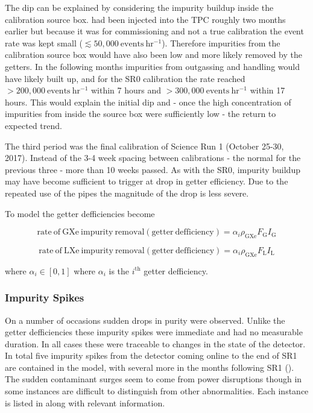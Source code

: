 The dip can be explained by considering the impurity buildup inside the calibration source box.  \rncal had been injected into the TPC
roughly two months earlier but because it was for commissioning and not a true calibration the event rate was kept small
($\lesssim 50,000\ \mathrm{events\ hr^{-1}}$).  Therefore
impurities from the calibration source box would have also been low and more likely removed by the getters.  In the following months
impurities from outgassing and handling would have likely built up, and for the SR0 calibration the rate reached
$> 200,000\ \mathrm{events\ hr^{-1}}$ within 7 hours and $> 300,000\ \mathrm{events\ hr^{-1}}$ within 17 hours.  This would explain the
initial dip and - once the high concentration of impurities from inside the source box were sufficiently low - the return to expected
trend.

The third period was the final \rncal calibration of Science Run 1 (October 25-30, 2017).  Instead of the 3-4 week spacing between
calibrations - the normal for the previous three - more than 10 weeks passed.  As with the SR0, impurity buildup may have become
sufficient to trigger at drop in getter efficiency.  Due to the repeated use of the pipes the magnitude of the drop is less severe.

To model the getter defficiencies 
become

\begin{equation}
\mathrm{rate\ of\ GXe\ impurity\ removal (getter\ defficiency)} = \alpha_i \rho_{\mathrm{GXe}} F_{\mathrm{G}} I_{\mathrm{G}}
\end{equation}

\begin{equation}
\mathrm{rate\ of\ LXe\ impurity\ removal (getter\ defficiency)} = \alpha_i \rho_{\mathrm{GXe}} F_{\mathrm{L}} I_{\mathrm{L}}
\end{equation}

\noindent where $\alpha_i \in [0, 1]$ where $\alpha_i$ is the $i^{\mathrm{th}}$ getter defficiency.



\subsubsection{Impurity Spikes}
\label{subsubsec:electron_lifetime_model_detector_effects_spikes}
On a number of occasions sudden drops in purity were observed.  Unlike the getter defficiencies these impurity spikes were immediate and
had no measurable duration.  In all cases these were traceable to changes in the state of the detector.  In total five impurity spikes
from the detector coming online to the end of SR1 are contained in the model, with several more in the months following SR1
(\secref{}).  The
sudden contaminant surges seem to come from power disruptions though in some instances are difficult to distinguish from other
abnormalities.  Each instance is listed in  along with relevant
information.

